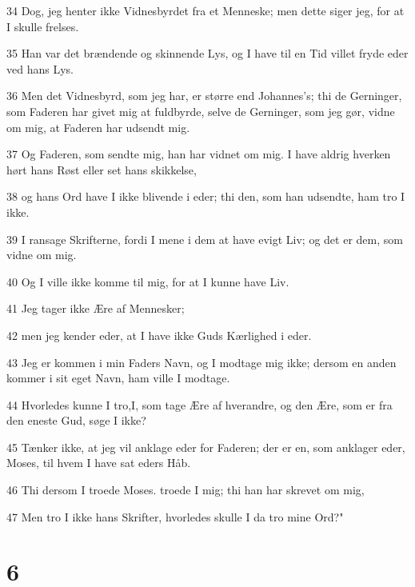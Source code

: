 \par 34 Dog, jeg henter ikke Vidnesbyrdet fra et Menneske; men dette siger jeg, for at I skulle frelses.
\par 35 Han var det brændende og skinnende Lys, og I have til en Tid villet fryde eder ved hans Lys.
\par 36 Men det Vidnesbyrd, som jeg har, er større end Johannes's; thi de Gerninger, som Faderen har givet mig at fuldbyrde, selve de Gerninger, som jeg gør, vidne om mig, at Faderen har udsendt mig.
\par 37 Og Faderen, som sendte mig, han har vidnet om mig. I have aldrig hverken hørt hans Røst eller set hans skikkelse,
\par 38 og hans Ord have I ikke blivende i eder; thi den, som han udsendte, ham tro I ikke.
\par 39 I ransage Skrifterne, fordi I mene i dem at have evigt Liv; og det er dem, som vidne om mig.
\par 40 Og I ville ikke komme til mig, for at I kunne have Liv.
\par 41 Jeg tager ikke Ære af Mennesker;
\par 42 men jeg kender eder, at I have ikke Guds Kærlighed i eder.
\par 43 Jeg er kommen i min Faders Navn, og I modtage mig ikke; dersom en anden kommer i sit eget Navn, ham ville I modtage.
\par 44 Hvorledes kunne I tro,I, som tage Ære af hverandre, og den Ære, som er fra den eneste Gud, søge I ikke?
\par 45 Tænker ikke, at jeg vil anklage eder for Faderen; der er en, som anklager eder, Moses, til hvem I have sat eders Håb.
\par 46 Thi dersom I troede Moses. troede I mig; thi han har skrevet om mig,
\par 47 Men tro I ikke hans Skrifter, hvorledes skulle I da tro mine Ord?"

\chapter{6}

